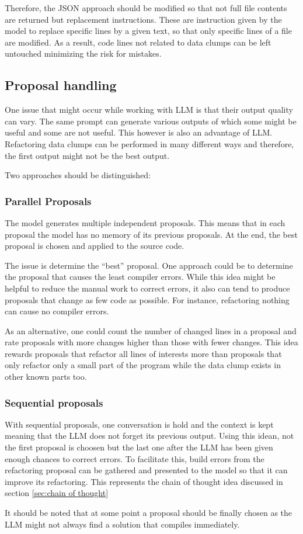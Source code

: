 Therefore, the \ac{JSON} approach should be modified so that not full file contents are returned but replacement instructions. These are instruction given by the model to replace specific lines by a given text, so that only specific lines of a file are modified.  As a result, code lines not related to data clumps can be left untouched minimizing the risk for mistakes. 


 



\subsection{Proposal handling}

One issue that might occur while working with \ac{LLM} is that their output quality can vary. The same prompt can generate various outputs of which some might be useful and some are not useful. This however is also an advantage of \acs{LLM}. Refactoring data clumps can be performed in many different ways and therefore, the first output might not be the best output. 

Two approaches should be distinguished:
\subsubsection{Parallel Proposals}
The model generates multiple independent proposals. This means that in each proposal the model has no memory of its previous proposals. At the end, the best proposal is chosen and applied to the source code.

The issue is determine the \enquote{best} proposal. One approach could be to determine the proposal that causes the least compiler errors. While this idea might be helpful to reduce the manual work to correct errors, it also can tend to produce proposals that change as few code as possible. For instance, refactoring nothing can cause no compiler errors.

As an alternative, one could count the number of changed lines in a proposal and rate proposals with more changes higher than those with fewer changes. This idea rewards proposals that refactor all lines of interests more than proposals that only refactor only a small part of the program while the data clump exists in other known parts too. 

\subsubsection{Sequential proposals}

With sequential proposals, one conversation is hold and the context is kept meaning that the \ac{LLM} does not forget its previous output. Using this idean, not the first proposal is choosen but the last one after the \ac{LLM} has been given enough chances to correct errors.  To facilitate this, build errors from the refactoring proposal can be gathered and presented to the model so that it can improve its refactoring. This represents the chain of thought idea discussed in section \ref{sec:chain of thought}

It should be noted that at some point a proposal should be finally chosen as the \ac{LLM} might not always find a solution that compiles immediately. 